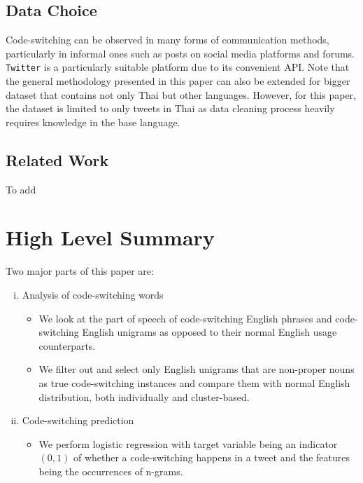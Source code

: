 \documentclass[conference]{IEEEtran}
\newcommand{\col}[1]{\textcolor{awesome}{#1}}
\begin{document}
\subsection{Data Choice}
Code-switching can be observed in many forms of communication methods, particularly in  informal ones such as posts on  social media platforms and forums. {\tt Twitter} is a particularly suitable platform due to its convenient API. 
Note that the general methodology presented in this paper can also be extended for bigger dataset that contains not only Thai but other languages. However, for this paper, the dataset is limited to only tweets in Thai as data cleaning process heavily requires knowledge in the base language. %


\subsection{Related Work}
\col{To add}







\section{High Level Summary}
Two major parts of this paper are:
\begin{enumerate}[(i)]
\item Analysis of code-switching words
\begin{itemize}
\item We look at the part of speech of code-switching English phrases and code-switching English unigrams as opposed to their normal English usage counterparts. 
\item We filter out and select only English unigrams that are non-proper nouns as true code-switching instances and compare them with normal English distribution, both individually and cluster-based. 
\end{itemize}
\item Code-switching prediction
\begin{itemize}
\item We perform logistic regression with target variable being an indicator $(0,1)$ of whether a code-switching happens in a tweet and the features being the occurrences of n-grams. 
\end{itemize}
\end{enumerate}
\end{document}
